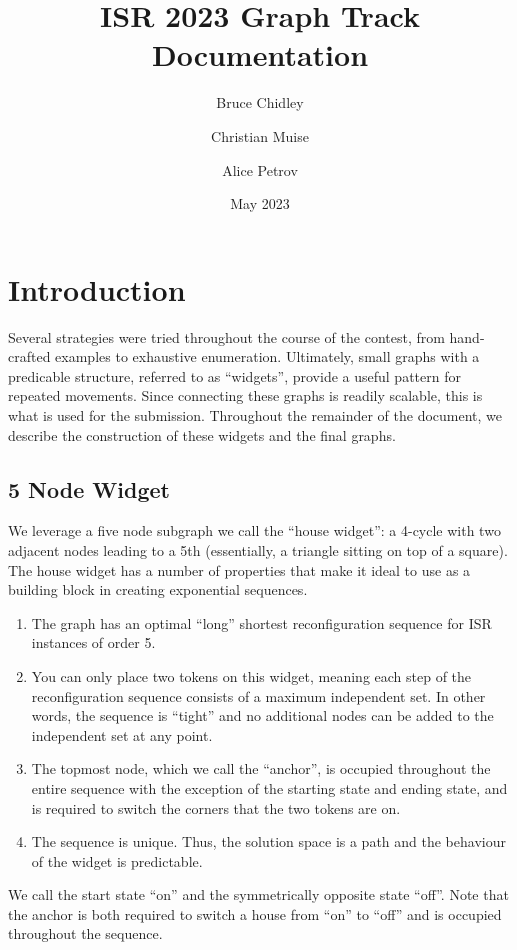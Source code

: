 \documentclass{article}
\title{ISR 2023 Graph Track Documentation}
\author[1]{Bruce Chidley}
\author[1]{Christian Muise}
\author[1]{Alice Petrov}
\affil[1]{Queen's University}
\date{May 2023}
\begin{document}
\maketitle

\section{Introduction}

Several strategies were tried throughout the course of the contest, from hand-crafted examples to exhaustive enumeration. Ultimately, small graphs with a predicable structure, referred to as ``widgets'', provide a useful pattern for repeated movements. Since connecting these graphs is readily scalable, this is what is used for the submission. Throughout the remainder of the document, we describe the construction of these widgets and the final graphs.

\subsection{5 Node Widget}

We leverage a five node subgraph we call the ``house widget'': a 4-cycle with two adjacent nodes leading to a 5th (essentially, a triangle sitting on top of a square). The house widget has a number of properties that make it ideal to use as a building block in creating exponential sequences.

\begin{enumerate}
\item The graph has an optimal ``long'' shortest reconfiguration sequence for ISR instances of order 5.
\item You can only place two tokens on this widget, meaning each step of the reconfiguration sequence consists of a maximum independent set. In other words, the sequence is ``tight'' and no additional nodes can be added to the independent set at any point.
\item  The topmost node, which we call the ``anchor'', is occupied throughout the entire sequence with the exception of the starting state and ending state, and is required to switch the corners that the two tokens are on.
\item The sequence is unique. Thus, the solution space is a path and the behaviour of the widget is predictable.
\end{enumerate}

We call the start state ``on'' and the symmetrically opposite state ``off''. Note that the anchor is both required to switch a house from ``on'' to ``off'' and is occupied throughout the sequence.
\end{document}
